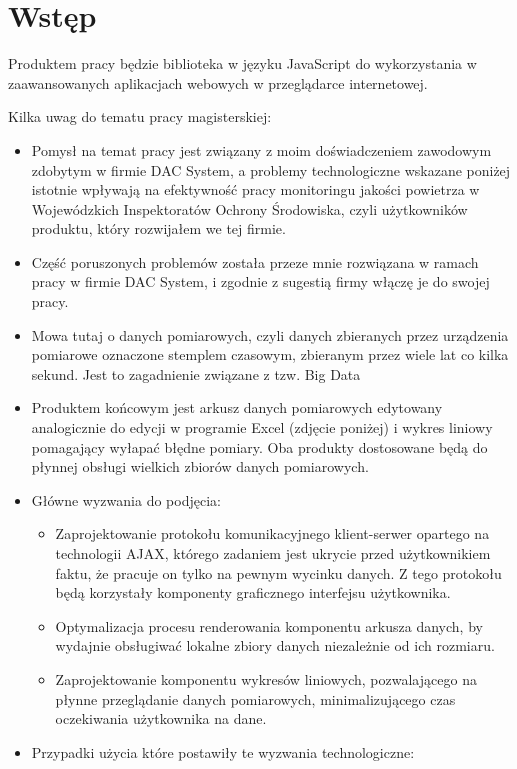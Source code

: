 \chapter{Wstęp}

Produktem pracy będzie biblioteka w języku JavaScript do wykorzystania w zaawansowanych aplikacjach webowych w przeglądarce internetowej.


Kilka uwag do tematu pracy magisterskiej:
\begin{itemize}
	\item Pomysł na temat pracy jest związany z moim doświadczeniem zawodowym zdobytym w firmie DAC System, a problemy technologiczne wskazane poniżej istotnie wpływają na efektywność pracy monitoringu jakości powietrza w Wojewódzkich Inspektoratów Ochrony Środowiska, czyli użytkowników produktu, który rozwijałem we tej firmie.
	\item Część poruszonych problemów została przeze mnie rozwiązana w ramach pracy w firmie DAC System, i zgodnie z sugestią firmy włączę je do swojej pracy.
	\item Mowa tutaj o danych pomiarowych, czyli danych zbieranych przez urządzenia pomiarowe oznaczone stemplem czasowym, zbieranym przez wiele lat co kilka sekund. Jest to zagadnienie związane z tzw. Big Data
	\item Produktem końcowym jest arkusz danych pomiarowych edytowany analogicznie do edycji w programie Excel (zdjęcie poniżej) i wykres liniowy pomagający wyłapać błędne pomiary. Oba produkty dostosowane będą do płynnej obsługi wielkich zbiorów danych pomiarowych.
	\item Główne wyzwania do podjęcia:
		\begin{itemize}
			\item Zaprojektowanie protokołu komunikacyjnego klient-serwer opartego na technologii AJAX, którego zadaniem jest ukrycie przed użytkownikiem faktu, że pracuje on tylko na pewnym wycinku danych. Z tego protokołu będą korzystały komponenty graficznego interfejsu użytkownika.
			\item Optymalizacja procesu renderowania komponentu arkusza danych, by wydajnie obsługiwać lokalne zbiory danych niezależnie od ich rozmiaru.
			\item Zaprojektowanie komponentu wykresów liniowych, pozwalającego na płynne przeglądanie danych pomiarowych, minimalizującego czas oczekiwania użytkownika na dane.
		\end{itemize}
	\item Przypadki użycia które postawiły te wyzwania technologiczne:

\end{itemize}
